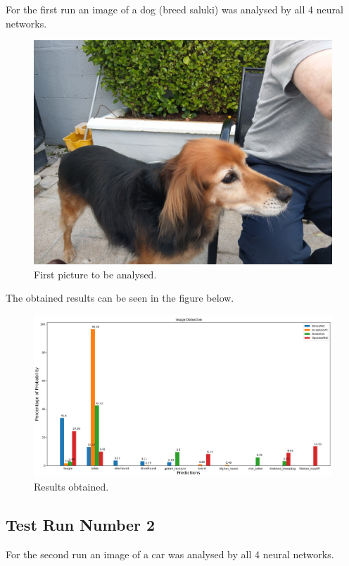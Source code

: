     \par For the first run an image of a dog (breed saluki) was analysed by all 4 neural networks.

    \begin{figure}[htb]
        \centering
        \includegraphics[scale = 0.20]{Sections/4InitialWork/4_images/run1_pic.jpg}
        \caption{First picture to be analysed.} 
    \end{figure}

    \par The obtained results can be seen in the figure below. 

    \begin{figure}[htb]
        \centering
        \includegraphics[scale = 0.37]{Sections/4InitialWork/4_images/run1_res.png}
        \caption{Results obtained.} 
    \end{figure}


    \newpage
    \subsection{Test Run Number 2}
    \par For the second run an image of a car was analysed by all 4 neural networks.

